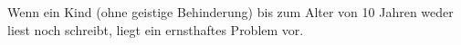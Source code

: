 Wenn ein Kind (ohne geistige Behinderung) bis zum Alter von 10 Jahren weder liest noch schreibt, liegt ein ernsthaftes Problem vor.